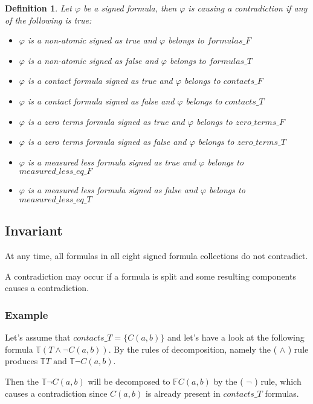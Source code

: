 \documentclass{article}
\newtheorem{defn}{Definition}[section]
\newcommand{\signT}{\mathbb{T}}
\newcommand{\signF}{\mathbb{F}}
\begin{document}
	\begin{defn}
	Let $\varphi$ be a signed formula, then $\varphi$ is causing a contradiction if any of the following is true:
	\begin{itemize}
		\item $\varphi$ is a non-atomic signed as true and $\varphi$ belongs to $formulas\_F$
		\item $\varphi$ is a non-atomic signed as false and $\varphi$ belongs to $formulas\_T$
		\item $\varphi$ is a contact formula signed as true and $\varphi$ belongs to $contacts\_F$
		\item $\varphi$ is a contact formula signed as false and $\varphi$ belongs to $contacts\_T$
		\item $\varphi$ is a zero terms formula signed as true and $\varphi$ belongs to $zero\_terms\_F$
		\item $\varphi$ is a zero terms formula signed as false and $\varphi$ belongs to $zero\_terms\_T$
		\item $\varphi$ is a measured less formula signed as true and $\varphi$ belongs to $measured\_less\_eq\_F$
		\item $\varphi$ is a measured less formula signed as false and $\varphi$ belongs to $measured\_less\_eq\_T$
	\end{itemize}
	\end{defn}
	\subsection*{Invariant}
	At any time, all formulas in all eight signed formula collections do not contradict.

	A contradiction may occur if a formula is split and some resulting components causes a contradiction.

	\subsubsection*{Example}
	Let's assume that $contacts\_T = \{ C(a, b)\}$ and let's have a look at the following formula $\signT(T \wedge \neg C(a,b))$.
	\newline
	By the rules of decomposition, namely the ( $\wedge$ ) rule produces $\signT T \text{ and } \signT\neg C(a,b)$.

	Then the $\signT\neg C(a,b)$ will be decomposed to $\signF C(a,b)$ by the ( $\neg$ ) rule, which causes a contradiction since $C(a,b)$ is already present in $contacts\_T$ formulas.
\end{document}
